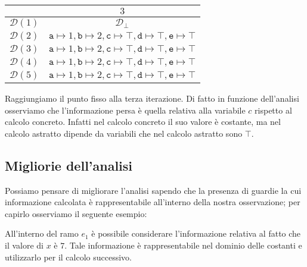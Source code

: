 \begin{table}[H]
    \begin{subtable}{\linewidth}
        \centering
        \begin{tabular}{|c|c|}
            \hline
            & $3$ \\
            \hline
            $\mathcal{D}(1)$
            & $\mathcal{D}_\bot$ \\
            \hline
            $\mathcal{D}(2)$ 
            & $\texttt{a} \mapsto 1, \texttt{b} \mapsto 2, \texttt{c} \mapsto \top, \texttt{d} \mapsto \top, \texttt{e} \mapsto \top$ \\
            \hline
            $\mathcal{D}(3)$ 
            & $\texttt{a} \mapsto 1, \texttt{b} \mapsto 2, \texttt{c} \mapsto \top, \texttt{d} \mapsto \top, \texttt{e} \mapsto \top$ \\
            \hline
            $\mathcal{D}(4)$ 
            & $\texttt{a} \mapsto 1, \texttt{b} \mapsto 2, \texttt{c} \mapsto \top, \texttt{d} \mapsto \top, \texttt{e} \mapsto \top$ \\
            \hline
            $\mathcal{D}(5)$ 
            & $\texttt{a} \mapsto 1, \texttt{b} \mapsto 2, \texttt{c} \mapsto \top, \texttt{d} \mapsto \top, \texttt{e} \mapsto \top$ \\
            \hline
        \end{tabular}
    \end{subtable}
\end{table}
Raggiungiamo il punto fisso alla terza iterazione.
Di fatto in funzione dell'analisi osserviamo che l'informazione persa è quella 
relativa alla variabile $c$ rispetto al calcolo concreto. Infatti nel calcolo 
concreto il suo valore è costante, ma nel calcolo astratto dipende da variabili 
che nel calcolo astratto sono $\top$.
\subsection{Migliorie dell'analisi}
Possiamo pensare di migliorare l'analisi sapendo che la presenza di guardie la cui 
informazione calcolata è rappresentabile all'interno della nostra osservazione; per capirlo 
osserviamo il seguente esempio:

\begin{algorithm}[H]
\end{algorithm}
All'interno del ramo $e_1$ è possibile considerare
l'informazione relativa al fatto che il valore di $x$ è $7$.
Tale informazione è rappresentabile nel dominio delle costanti e utilizzarlo per il calcolo 
successivo.

